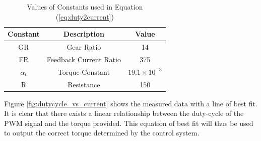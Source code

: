 \begin{table}[]
	\centering
	\begin{tabular}{|c|c|c|}
		\hline
		Constant & Description & Value \\
		\hline
		\hline
		GR &  Gear Ratio & 14 \\
		\hline
		FR & Feedback Current Ratio & 375 \\
		\hline
		$\alpha_{t}$ & Torque Constant & $19.1\times 10^{-3}$ \\
		\hline
		R & Resistance & 150 \\
		\hline
	\end{tabular}
	\caption{Values of Constants used in Equation (\ref{eq:duty2current})}
	\label{table:duty2current_constants}
\end{table}

 Figure \ref{fig:dutycycle_vs_current} shows the measured data with a line of best fit. It is clear that there exists a linear relationship between the duty-cycle of the PWM signal and the torque provided. This equation of best fit will thus be used to output the correct torque determined by the control system.

